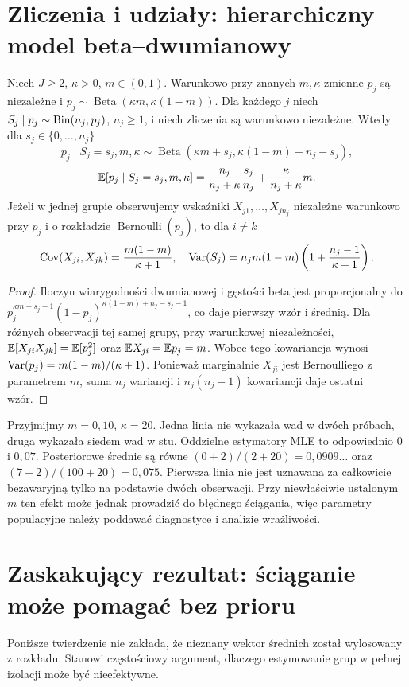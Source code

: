 \section{Zliczenia i udziały: hierarchiczny model beta--dwumianowy}
\begin{twierdzenie}
\label{thm:hierarchical-beta-binomial}
Niech $J\ge2$, $\kappa>0$, $m\in(0,1)$.
Warunkowo przy znanych $m,\kappa$ zmienne $p_j$ są niezależne
i $p_j\sim\operatorname{Beta}(\kappa m,\kappa(1-m))$.
Dla każdego $j$ niech $S_j\mid p_j\sim\operatorname{Bin}(n_j,p_j)$,
$n_j\ge1$, i niech zliczenia są warunkowo niezależne.
Wtedy dla $s_j\in\{0,\ldots,n_j\}$
\[
 p_j\mid S_j=s_j,m,\kappa
 \sim\operatorname{Beta}(\kappa m+s_j,\kappa(1-m)+n_j-s_j),
\]
\[
 \mathbb E[p_j\mid S_j=s_j,m,\kappa]
 =\frac{n_j}{n_j+\kappa}\frac{s_j}{n_j}
 +\frac{\kappa}{n_j+\kappa}m.
\]
Jeżeli w jednej grupie obserwujemy wskaźniki
$X_{j1},\ldots,X_{jn_j}$ niezależne warunkowo przy $p_j$
i o rozkładzie $\operatorname{Bernoulli}(p_j)$, to dla $i\ne k$
\[
 \operatorname{Cov}(X_{ji},X_{jk})=\frac{m(1-m)}{\kappa+1},\quad
 \operatorname{Var}(S_j)=n_jm(1-m)\left(1+\frac{n_j-1}{\kappa+1}\right).
\]
\end{twierdzenie}
\begin{proof}
Iloczyn wiarygodności dwumianowej i gęstości beta
jest proporcjonalny do
$p_j^{\kappa m+s_j-1}(1-p_j)^{\kappa(1-m)+n_j-s_j-1}$,
co daje pierwszy wzór i średnią. Dla różnych obserwacji
tej samej grupy, przy warunkowej niezależności,
$\mathbb E[X_{ji}X_{jk}]=\mathbb E[p_j^2]$ oraz
$\mathbb E X_{ji}=\mathbb E p_j=m$.
Wobec tego kowariancja wynosi
$\operatorname{Var}(p_j)=m(1-m)/(\kappa+1)$.
Ponieważ marginalnie $X_{ji}$ jest Bernoulliego
z parametrem $m$, suma $n_j$ wariancji i
$n_j(n_j-1)$ kowariancji daje ostatni wzór.
\end{proof}

\begin{przyklad}
Przyjmijmy $m=0{,}10$, $\kappa=20$. Jedna linia nie wykazała
wad w dwóch próbach, druga wykazała siedem wad w stu.
Oddzielne estymatory MLE to odpowiednio $0$ i $0{,}07$.
Posteriorowe średnie są równe
$(0+2)/(2+20)=0{,}0909\ldots$ oraz
$(7+2)/(100+20)=0{,}075$.
Pierwsza linia nie jest uznawana za całkowicie bezawaryjną
tylko na podstawie dwóch obserwacji. Przy niewłaściwie
ustalonym $m$ ten efekt może jednak prowadzić do błędnego
ściągania, więc parametry populacyjne należy poddawać
diagnostyce i analizie wrażliwości.
\end{przyklad}

\section{Zaskakujący rezultat: ściąganie może pomagać bez prioru}
Poniższe twierdzenie nie zakłada, że nieznany wektor średnich
został wylosowany z rozkładu. Stanowi częstościowy argument,
dlaczego estymowanie grup w pełnej izolacji może być nieefektywne.

